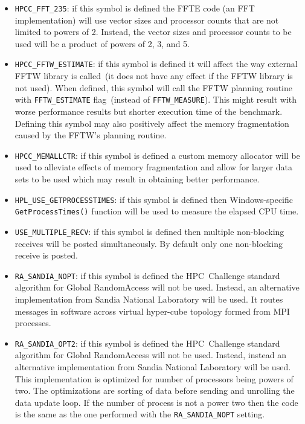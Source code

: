 \documentclass[twocolumn]{article}
\begin{document}
\begin{itemize}

\item \texttt{HPCC\_FFT\_235}: if this symbol is defined the FFTE
code (an FFT implementation) will use vector sizes and processor
counts that are not limited to powers of 2. Instead, the vector sizes
and processor counts to be used will be a product of powers of 2, 3,
and 5.

\item \texttt{HPCC\_FFTW\_ESTIMATE}: if this symbol is defined it will
affect the way external FFTW library is called~(it does not have any
effect if the FFTW library is not used). When defined, this symbol
will call the FFTW planning routine with \texttt{FFTW\_ESTIMATE}
flag~(instead of \texttt{FFTW\_MEASURE}). This might result with worse
performance results but shorter execution time of the
benchmark. Defining this symbol may also positively affect the memory
fragmentation caused by the FFTW's planning routine.

\item \texttt{HPCC\_MEMALLCTR}: if this symbol is defined a custom
memory allocator will be used to alleviate effects of memory
fragmentation and allow for larger data sets to be used which may
result in obtaining better performance.

\item \texttt{HPL\_USE\_GETPROCESSTIMES}: if this symbol is defined
then Windows-specific \texttt{GetProcessTimes()} function will be used
to measure the elapsed CPU time.

\item \texttt{USE\_MULTIPLE\_RECV}: if this symbol is defined then multiple non-blocking
receives will be posted simultaneously. By default only one non-blocking
receive is posted.

\item \texttt{RA\_SANDIA\_NOPT}: if this symbol is defined the
HPC~Challenge standard algorithm for Global RandomAccess will not be
used. Instead, an alternative implementation from Sandia
National Laboratory will be used. It routes messages in software
across virtual hyper-cube topology formed from MPI processes.

\item \texttt{RA\_SANDIA\_OPT2}: if this symbol is defined the
HPC~Challenge standard algorithm for Global RandomAccess will not be
used. Instead, instead an alternative implementation from Sandia
National Laboratory will be used. This implementation is optimized for
number of processors being powers of two. The optimizations
are sorting of data before sending and unrolling the data update
loop. If the number of process is not a power two then the code
is the same as the one performed with the \texttt{RA\_SANDIA\_NOPT} setting.


\end{itemize}
\end{document}
